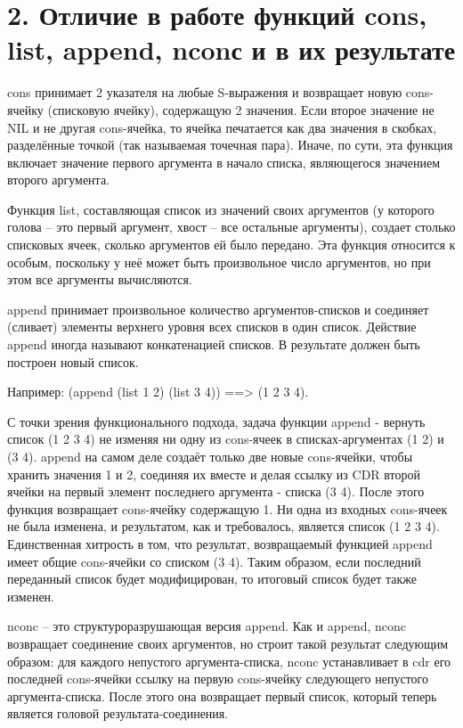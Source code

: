 \documentclass[12pt]{report}
\begin{document}
\section*{2. Отличие в работе функций cons, list, append, nconс и в их результате}

cons принимает 2 указателя на любые S-выражения и возвращает новую cons-ячейку (списковую ячейку), содержащую 2 значения. Если второе значение не NIL и не другая cons-ячейка, то ячейка печатается как два значения в скобках, разделённые точкой (так называемая точечная пара). Иначе, по сути, эта функция включает значение первого аргумента в начало списка, являющегося значением второго аргумента. 

Функция list, составляющая список из значений своих аргументов (у которого голова -- это первый аргумент, хвост -- все остальные аргументы), создает столько списковых ячеек, сколько аргументов ей было передано. Эта функция относится к особым, поскольку у неё может быть произвольное число аргументов, но при этом все аргументы вычисляются.

append принимает произвольное количество аргументов-списков и соединяет (сливает)  элементы верхнего уровня всех списков в один список. Действие append иногда называют конкатенацией списков. В результате должен быть построен новый список.

Например: (append (list 1 2) (list 3 4)) ==> (1 2 3 4). 

С точки зрения функционального подхода, задача функции append - вернуть список (1 2 3 4) не изменяя ни одну из cons-ячеек в списках-аргументах (1 2) и (3 4). append на самом деле создаёт только две новые cons-ячейки, чтобы хранить значения 1 и 2, соединяя их вместе и делая ссылку из CDR второй ячейки на первый элемент последнего аргумента - списка (3 4). После этого функция возвращает cons-ячейку содержащую 1. Ни одна из входных cons-ячеек не была изменена, и результатом, как и требовалось, является список (1 2 3 4). Единственная хитрость в том, что результат, возвращаемый функцией append имеет общие cons-ячейки со списком (3 4). Таким образом, если последний переданный список будет модифицирован, то  итоговый список будет также изменен.

nconc -- это структуроразрушающая версия append. Как и append, nconc возвращает соединение своих аргументов, но строит такой результат следующим образом: для каждого непустого аргумента-списка, nconc устанавливает в cdr его последней cons-ячейки ссылку на первую cons-ячейку следующего непустого аргумента-списка. После этого она возвращает первый список, который теперь является головой результата-соединения.
\end{document}
